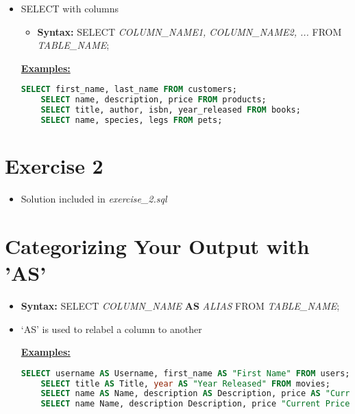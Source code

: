 \documentclass[12pt]{article}
\begin{document}
\bigskip

\begin{itemize}
    \item SELECT with columns
    \begin{itemize}
        \item \textbf{Syntax:} SELECT \textit{COLUMN\_NAME1, COLUMN\_NAME2, ...} FROM \textit{TABLE\_NAME};
    \end{itemize}

    \bigskip

    \underline{\textbf{Examples:}}

    \bigskip

    \begin{lstlisting}[language=SQL]
    SELECT first_name, last_name FROM customers;
    SELECT name, description, price FROM products;
    SELECT title, author, isbn, year_released FROM books;
    SELECT name, species, legs FROM pets;
    \end{lstlisting}
\end{itemize}

\bigskip

\section{Exercise 2}

\bigskip

\begin{itemize}
    \item Solution included in \textit{exercise\_2.sql}
\end{itemize}

\bigskip

\section{Categorizing Your Output with 'AS'}

\bigskip

\begin{itemize}
    \item \textbf{Syntax:} SELECT \textit{COLUMN\_NAME} \textbf{AS} \textit{ALIAS} FROM \textit{TABLE\_NAME};
    \item `AS' is used to relabel a column to another

    \bigskip

    \underline{\textbf{Examples:}}

    \bigskip

    \begin{lstlisting}[language=SQL]
    SELECT username AS Username, first_name AS "First Name" FROM users;
    SELECT title AS Title, year AS "Year Released" FROM movies;
    SELECT name AS Name, description AS Description, price AS "Current Price" FROM products;
    SELECT name Name, description Description, price "Current Price" FROM products;
    \end{lstlisting}
\end{itemize}
\end{document}
